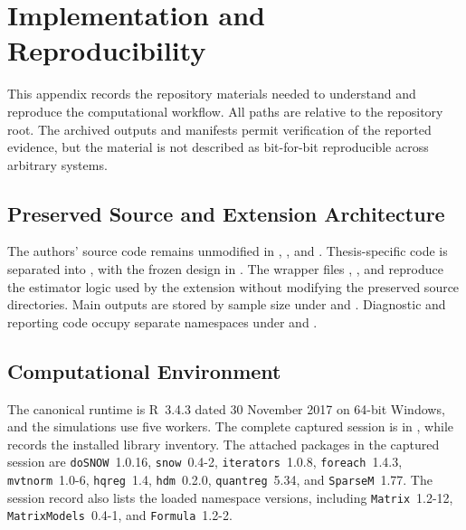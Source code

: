 \section{Implementation and Reproducibility}
\label{app:implementation-reproducibility}

This appendix records the repository materials needed to understand and reproduce the computational workflow. All paths are relative to the repository root. The archived outputs and manifests permit verification of the reported evidence, but the material is not described as bit-for-bit reproducible across arbitrary systems.

\subsection{Preserved Source and Extension Architecture}

The authors' source code remains unmodified in , , and . Thesis-specific code is separated into , with the frozen design in . The wrapper files , , and  reproduce the estimator logic used by the extension without modifying the preserved source directories. Main outputs are stored by sample size under  and . Diagnostic and reporting code occupy separate namespaces under  and .

\subsection{Computational Environment}

The canonical runtime is R~3.4.3 dated 30 November 2017 on 64-bit Windows, and the simulations use five workers. The complete captured session is in , while  records the installed library inventory. The attached packages in the captured session are \texttt{doSNOW}~1.0.16, \texttt{snow}~0.4-2, \texttt{iterators}~1.0.8, \texttt{foreach}~1.4.3, \texttt{mvtnorm}~1.0-6, \texttt{hqreg}~1.4, \texttt{hdm}~0.2.0, \texttt{quantreg}~5.34, and \texttt{SparseM}~1.77. The session record also lists the loaded namespace versions, including \texttt{Matrix}~1.2-12, \texttt{MatrixModels}~0.4-1, and \texttt{Formula}~1.2-2.

